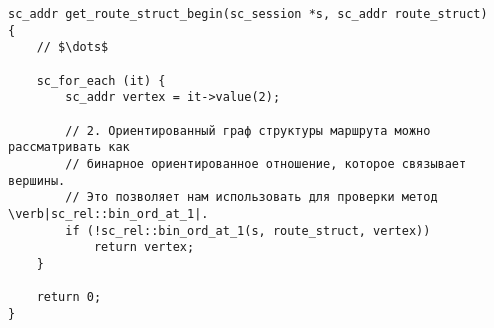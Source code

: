 \begin{lstlisting}[texcl]
sc_addr get_route_struct_begin(sc_session *s, sc_addr route_struct)
{
    // $\dots$

    sc_for_each (it) {
        sc_addr vertex = it->value(2);

        // 2. Ориентированный граф структуры маршрута можно рассматривать как
        // бинарное ориентированное отношение, которое связывает вершины.
        // Это позволяет нам использовать для проверки метод \verb|sc_rel::bin_ord_at_1|.
        if (!sc_rel::bin_ord_at_1(s, route_struct, vertex))
            return vertex;
    }

    return 0;
}
\end{lstlisting}


